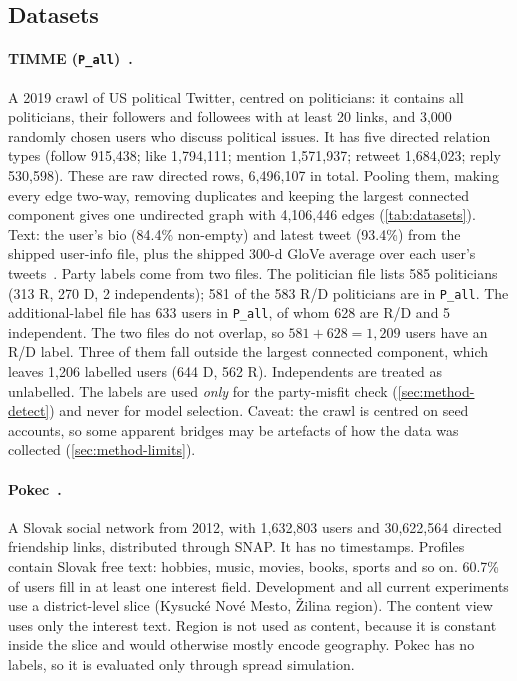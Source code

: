 \subsection{Datasets}
\label{sec:setup-data}


\paragraph{TIMME (\texttt{P\_all})~\citep{xiao2020timme}.}
A 2019 crawl of US political Twitter, centred on politicians: it contains all
politicians, their followers and followees with at least 20 links, and 3,000 randomly
chosen users who discuss political issues. It has five directed relation types (follow
915,438; like 1,794,111; mention 1,571,937; retweet 1,684,023; reply 530,598). These
are raw directed rows, 6,496,107 in total. Pooling them, making every edge two-way,
removing duplicates and keeping the largest connected component gives one undirected
graph with 4,106,446 edges (\cref{tab:datasets}). Text: the user's bio (84.4\% non-empty) and
latest tweet (93.4\%) from the shipped user-info file, plus the shipped 300-d GloVe
average over each user's tweets~\citep{pennington2014glove}. Party labels come from
two files. The politician file lists 585 politicians (313 R, 270 D, 2 independents);
581 of the 583 R/D politicians are in \texttt{P\_all}. The additional-label file has
633 users in \texttt{P\_all}, of whom 628 are R/D and 5 independent. The two files do
not overlap, so $581+628=1{,}209$ users have an R/D label. Three of them fall outside
the largest connected component, which leaves 1,206 labelled users (644 D, 562 R).
Independents are treated as unlabelled. The labels are used
\emph{only} for the party-misfit check (\cref{sec:method-detect}) and never for model
selection. Caveat: the crawl is centred on seed accounts, so some apparent bridges may
be artefacts of how the data was collected (\cref{sec:method-limits}).

\paragraph{Pokec~\citep{takac2012pokec,leskovec2014snap}.}
A Slovak social network from 2012, with 1,632,803 users and 30,622,564 directed
friendship links, distributed through SNAP. It has no timestamps. Profiles contain
Slovak free text: hobbies, music, movies, books, sports and so on. 60.7\% of users fill
in at least one interest field. Development and all current experiments use a
district-level slice (Kysuck\'e Nov\'e Mesto, \v{Z}ilina region). The content view uses
only the interest text. Region is not used as content, because it is constant inside
the slice and would otherwise mostly encode geography. Pokec has no labels, so it is
evaluated only through spread simulation.

